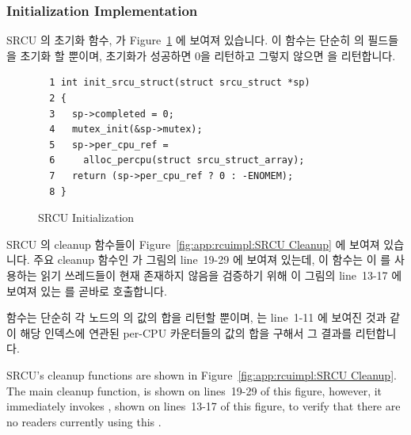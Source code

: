 \subsubsection{Initialization Implementation}
\label{sec:app:rcuimpl:Initialization Implementation}

SRCU 의 초기화 함수,  가
Figure~\ref{fig:app:rcuimpl:SRCU Initialization} 에 보여져 있습니다.
이 함수는 단순히   의 필드들을 초기화 할 뿐이며,
초기화가 성공하면 0을 리턴하고 그렇지 않으면  을 리턴합니다.

\begin{figure}[htbp]
{ \scriptsize
\begin{verbatim}
  1 int init_srcu_struct(struct srcu_struct *sp)
  2 {
  3   sp->completed = 0;
  4   mutex_init(&sp->mutex);
  5   sp->per_cpu_ref =
  6     alloc_percpu(struct srcu_struct_array);
  7   return (sp->per_cpu_ref ? 0 : -ENOMEM);
  8 }
\end{verbatim}
}
\caption{SRCU Initialization}
\label{fig:app:rcuimpl:SRCU Initialization}
\end{figure}

SRCU 의 cleanup 함수들이
Figure~\ref{fig:app:rcuimpl:SRCU Cleanup} 에 보여져 있습니다.
주요 cleanup 함수인  가 그림의 line~19-29 에 보여져
있는데, 이 함수는 이   를 사용하는 읽기 쓰레드들이
현재 존재하지 않음을 검증하기 위해 이 그림의 line~13-17 에 보여져 있는
 를 곧바로 호출합니다.

 함수는 단순히 각 노드의
 의 값의 합을 리턴할 뿐이며,
 는 line~1-11 에 보여진 것과 같이 해당 인덱스에
연관된 per-CPU 카운터들의 값의 합을 구해서 그 결과를 리턴합니다.
\iffalse

SRCU's cleanup functions are shown in
Figure~\ref{fig:app:rcuimpl:SRCU Cleanup}.
The main cleanup function,  is shown
on lines~19-29 of this figure, however, it immediately invokes
, shown on lines~13-17 of this figure,
to verify that there are no readers currently using this
 .

